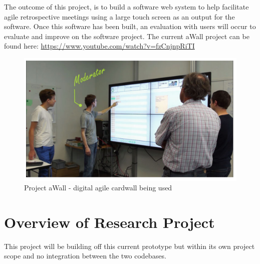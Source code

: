 \documentclass[11pt
              , a4paper
              , twoside
              , openright
              ]{report}
\begin{document}
The outcome of this project, is to build a software web system to help facilitate agile retrospective meetings using a large touch screen as an output for the software. Once this software has been built, an evaluation with users will occur to evaluate and improve on the software project. The current aWall project can be found here: \url{https://www.youtube.com/watch?v=fzCnjnpRiTI}

\begin{figure}[ht]
	\centering
	\includegraphics{aWall_introduction}
	\caption{Project aWall - digital agile cardwall being used \cite{xp2017_aWall}}
\end{figure}

\section{Overview of Research Project}
This project will be building off this current prototype but within its own project scope and no integration between the two codebases.
\end{document}
